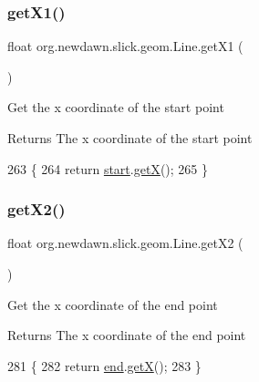 \subsubsection{\texorpdfstring{get\+X1()}{getX1()}}
{\footnotesize\ttfamily float org.\+newdawn.\+slick.\+geom.\+Line.\+get\+X1 (\begin{DoxyParamCaption}{ }\end{DoxyParamCaption})\hspace{0.3cm}{\ttfamily [inline]}}

Get the x coordinate of the start point

\begin{DoxyReturn}{Returns}
The x coordinate of the start point 
\end{DoxyReturn}

\begin{DoxyCode}
263                          \{
264         \textcolor{keywordflow}{return} \mbox{\hyperlink{classorg_1_1newdawn_1_1slick_1_1geom_1_1_line_aaf3a6c6053990b96a501b80081258f92}{start}}.\mbox{\hyperlink{classorg_1_1newdawn_1_1slick_1_1geom_1_1_vector2f_ad706bc5b80f139236e643a274947262b}{getX}}();
265     \}
\end{DoxyCode}
\mbox{\label{classorg_1_1newdawn_1_1slick_1_1geom_1_1_line_a3c1e716e9f47d052d6f54bb60ba421a2}} 
\subsubsection{\texorpdfstring{get\+X2()}{getX2()}}
{\footnotesize\ttfamily float org.\+newdawn.\+slick.\+geom.\+Line.\+get\+X2 (\begin{DoxyParamCaption}{ }\end{DoxyParamCaption})\hspace{0.3cm}{\ttfamily [inline]}}

Get the x coordinate of the end point

\begin{DoxyReturn}{Returns}
The x coordinate of the end point 
\end{DoxyReturn}

\begin{DoxyCode}
281                          \{
282         \textcolor{keywordflow}{return} \mbox{\hyperlink{classorg_1_1newdawn_1_1slick_1_1geom_1_1_line_abc89f3da558e2d29ad48f3c453c25f92}{end}}.\mbox{\hyperlink{classorg_1_1newdawn_1_1slick_1_1geom_1_1_vector2f_ad706bc5b80f139236e643a274947262b}{getX}}();
283     \}
\end{DoxyCode}
\mbox{\label{classorg_1_1newdawn_1_1slick_1_1geom_1_1_line_a51500ef16d5815ffb73288ba550567c7}} 
